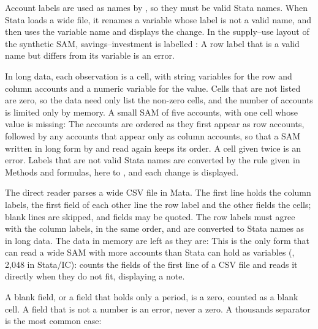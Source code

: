 
Account labels are used as names by , so they must be valid
Stata names. When Stata loads a wide file, it renames a variable whose label
is not a valid name, and  then uses the variable name and
displays the change. In the supply--use layout of the synthetic SAM,
savings--investment is labelled :
A row label that is a valid name but differs from its variable is an error.


In long data, each observation is a cell, with string variables for the row
and column accounts and a numeric variable for the value. Cells that are not
listed are zero, so the data need only list the non-zero cells, and the number
of accounts is limited only by memory. A small SAM of five accounts, with one
cell whose value is missing:
The accounts are ordered as they first appear as row accounts, followed by any
accounts that appear only as column accounts, so that a SAM written in long
form by  and read again keeps its order. A cell given
twice is an error. Labels that are not valid Stata names are converted by the
rule given in Methods and formulas, here  to , and each change
is displayed.


The direct reader parses a wide CSV file in Mata. The first line holds the
column labels, the first field of each other line the row label and the other
fields the cells; blank lines are skipped, and fields may be quoted. The row
labels must agree with the column labels, in the same order, and are converted
to Stata names as in long data. The data in memory are left as they are:
This is the only form that can read a wide SAM with more accounts than Stata
can hold as variables (, 2,048 in Stata/IC): 
counts the fields of the first line of a CSV file and reads it directly when
they do not fit, displaying a note.

A blank field, or a field that holds only a period, is a zero, counted as a
blank cell. A field that is not a number is an error, never a zero. A thousands
separator is the most common case:


